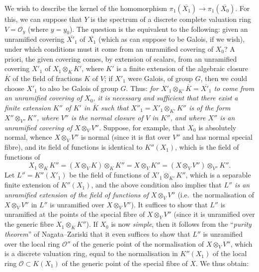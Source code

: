 \documentclass{article}
\newcommand{\oldpage}[1]{\marginpar{\footnotesize$\Big\vert$ \textit{p.~#1}}}
\theoremstyle{definition}
\theoremstyle{definition}
\theoremstyle{definition}
\theoremstyle{definition}
\theoremstyle{remark}
\begin{document}
We wish to describe the kernel of the homomorphism \(\pi_1(\overline{X_1})\to\pi_1(\overline{X_0})\).
For this, we can suppose that \(Y\) is the spectrum of a discrete complete valuation ring \(V={\mathscr{O}}_y\) (where \(y=y_0\)).
The question is the equivalent to the following:
given an unramified covering \(\overline{X'_1}\) of \(\overline{X_1}\) (which as can suppose to be Galois, if we wish), under which conditions must it come from an unramified covering of \(X_0\)?
A priori, the given covering comes, by extension of scalars, from an unramified covering \(X'_1\) of \(X_1\otimes_KK'\), where \(K'\) is a finite extension of the algebraic closure \(\overline{K}\) of the field of fractions \(K\) of \(V\);
if \(X'_1\) were Galois, of group \(G\), then we could choose \(X'_1\) to also be Galois of group \(G\).
Thus: \emph{for \(X'_1\otimes_{K'}\overline{K}=\overline{X'_1}\) to come from an unramified covering of \(X_0\), it is necessary and sufficient that there exist a finite extension \(K''\) of \(K'\) in \(\overline{K}\) such that \(X''_1=X'_1\otimes_{K'}K''\) is of the form \(X''\otimes_{V''}K''\), where \(V''\) is the normal closure of \(V\) in \(K''\), and where \(X''\) is an unramified covering of \(X\otimes_V V''\).}
Suppose, for example, that \(X_0\) is absolutely normal, whence \(X\otimes_V V''\) is normal (since it is flat over \(V''\) and has normal special fibre), and its field of functions is identical to \(K''(X_1)\), which is the field of functions of
\[
  X_1\otimes_K K'' = (X\otimes_VK)\otimes_KK'' = X\otimes_VK'' = (X\otimes_VV'')\otimes_{V''}K''.
\]
\oldpage{182-26}Let \(L''=K''(X'_1)\) be the field of functions of \(X'_1\otimes_{K'}K''\), which is a separable finite extension of \(K''(X_1)\), and the above condition also implies that \emph{\(L''\) is an unramified extension of the field of functions of \(X\otimes_VV''\)} (i.e.~the normalisation of \(X\otimes_V V''\) in \(L''\) is unramified over \(X\otimes_VV''\)).
It suffices to show that \(L''\) is unramified at the points of the special fibre of \(X\otimes_VV''\) (since it is unramified over the generic fibre \(X_1\otimes_KK''\)).
If \(X_0\) is now \emph{simple}, then it follows from the ``\emph{purity theorem}'' of Nagata--Zariski that it even suffices to show that \(L''\) is unramified over the local ring \({\mathscr{O}}''\) of the generic point of the normalisation of \(X\otimes_VV''\), which is a discrete valuation ring, equal to the normalisation in \(K''(X_1)\) of the local ring \({\mathscr{O}}\subset K(X_1)\) of the generic point of the special fibre of \(X\).
We thus obtain:
\end{document}
